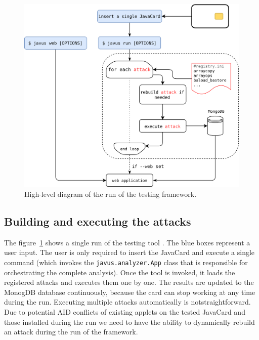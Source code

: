 \documentclass{../llncs/llncs}
\begin{document}
    \begin{figure}[htb]
        \centering
        \includegraphics[width=.9\textwidth]{src/diagrams/full-design-new.png}
    \caption{High-level diagram of the run of the testing framework.} %
        \label{fig:full-design-diagram}
    \end{figure}

        



    \subsection{Building and executing the attacks}\label{sec:build-execute-attacks}

    The figure~\ref{fig:full-design-diagram} shows a single run of the testing tool \javus. The blue boxes represent a user input. The user is only required to insert the JavaCard and execute a single command \javusrun (which invokes the \texttt{javus.analyzer.App} class that is responsible for orchestrating the complete analysis). Once the tool is invoked, it loads the registered attacks and executes them one by one. The results are updated to the MonogDB database continuously, because the card can stop working at any time during the run. Executing multiple attacks automatically is not\linebreak straightforward.  Due to potential AID conflicts of existing applets on the tested JavaCard and those installed during the run we need to have the ability to dynamically rebuild an attack during the run of the framework.
\end{document}
